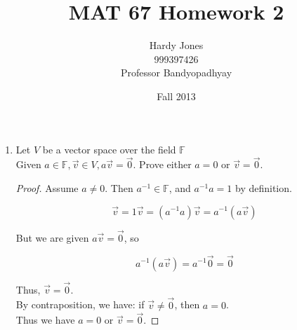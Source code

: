 \documentclass[12pt,letterpaper]{article}
\title{MAT 67 Homework 2\vspace{-2ex}}
\author{Hardy Jones\\
        999397426\\
        Professor Bandyopadhyay\vspace{-2ex}}
\date{Fall 2013}
\begin{document}
  \maketitle

  \begin{enumerate}
    \item Let $V$ be a vector space over the field $\mathbb{F}$ \\
    
      Given $a \in \mathbb{F}, \vec{v} \in V, a\vec{v} = \vec{0}$.
      Prove either $a = 0$ or $\vec{v} = \vec{0}$.
      
      \begin{proof}
        Assume $a \neq 0$.
        Then $a^{-1} \in \mathbb{F}$, and $a^{-1}a = 1$ by definition.
        
        \[\vec{v} = 1\vec{v} = (a^{-1}a)\vec{v} = a^{-1}(a\vec{v})\]
        
        But we are given $a\vec{v} = \vec{0}$, so
        
        \[a^{-1}(a\vec{v}) = a^{-1}\vec{0} = \vec{0}\]
        
        Thus, $\vec{v} = \vec{0}$. \\
        
        By contraposition, we have: if $\vec{v} \neq \vec{0}$, then $a = 0$. \\
        
        Thus we have $a = 0$ or $\vec{v} = \vec{0}$.
      \end{proof}
  \end{enumerate}
\end{document}
